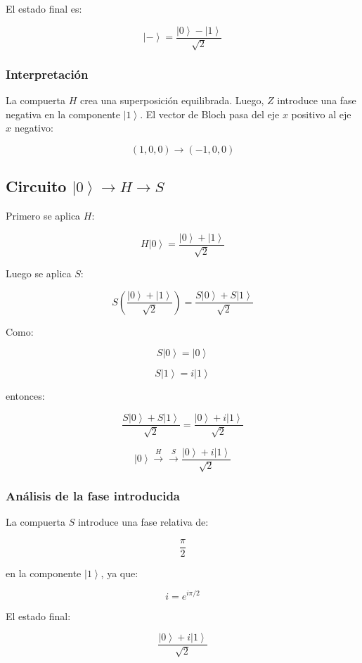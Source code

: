 \documentclass[12pt,a4paper]{article}
\newcommand{\ket}[1]{\left|#1\right\rangle}
\begin{document}
El estado final es:

\[
\ket{-}=\frac{\ket{0}-\ket{1}}{\sqrt{2}}
\]

\subsubsection*{Interpretación}

La compuerta \(H\) crea una superposición equilibrada. Luego, \(Z\) introduce una fase negativa en la componente \(\ket{1}\). El vector de Bloch pasa del eje \(x\) positivo al eje \(x\) negativo:

\[
(1,0,0)\rightarrow(-1,0,0)
\]

\subsection{Circuito \texorpdfstring{$\ket{0}\rightarrow H\rightarrow S$}{ket 0 H S}}

Primero se aplica \(H\):

\[
H\ket{0}=
\frac{\ket{0}+\ket{1}}{\sqrt{2}}
\]

Luego se aplica \(S\):

\[
S\left(
\frac{\ket{0}+\ket{1}}{\sqrt{2}}
\right)
=
\frac{S\ket{0}+S\ket{1}}{\sqrt{2}}
\]

Como:

\[
S\ket{0}=\ket{0}
\]

\[
S\ket{1}=i\ket{1}
\]

entonces:

\[
\frac{S\ket{0}+S\ket{1}}{\sqrt{2}}
=
\frac{\ket{0}+i\ket{1}}{\sqrt{2}}
\]

\begin{resultado}
\[
\boxed{
\ket{0}\xrightarrow{H}\xrightarrow{S}
\frac{\ket{0}+i\ket{1}}{\sqrt{2}}
}
\]
\end{resultado}

\subsubsection*{Análisis de la fase introducida}

La compuerta \(S\) introduce una fase relativa de:

\[
\frac{\pi}{2}
\]

en la componente \(\ket{1}\), ya que:

\[
i=e^{i\pi/2}
\]

El estado final:

\[
\frac{\ket{0}+i\ket{1}}{\sqrt{2}}
\]
\end{document}
